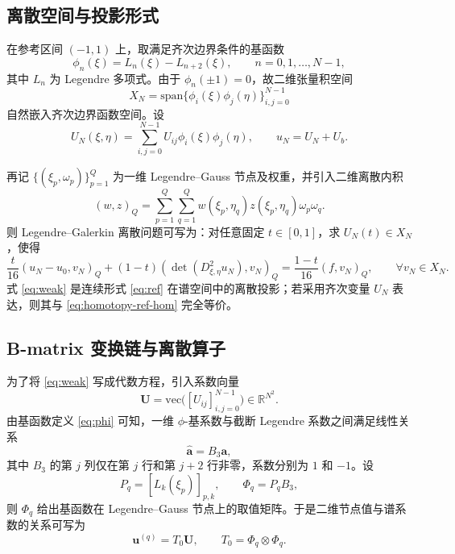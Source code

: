 \documentclass[11pt,a4paper]{article}
\begin{document}
\subsection{离散空间与投影形式}
在参考区间 $(-1,1)$ 上，取满足齐次边界条件的基函数
\begin{equation}
\phi_n(\xi)=L_n(\xi)-L_{n+2}(\xi),
\qquad n=0,1,\dots,N-1,
\label{eq:phi}
\end{equation}
其中 $L_n$ 为 Legendre 多项式。由于 $\phi_n(\pm 1)=0$，故二维张量积空间
\begin{equation}
X_N=\mathrm{span}\{\phi_i(\xi)\phi_j(\eta)\}_{i,j=0}^{N-1}
\label{eq:space}
\end{equation}
自然嵌入齐次边界函数空间。设
\begin{equation}
U_N(\xi,\eta)=\sum_{i,j=0}^{N-1}U_{ij}\phi_i(\xi)\phi_j(\eta),
\qquad
u_N=U_N+U_b.
\label{eq:UN}
\end{equation}

再记 $\{(\xi_p,\omega_p)\}_{p=1}^Q$ 为一维 Legendre--Gauss 节点及权重，并引入二维离散内积
\begin{equation}
(w,z)_Q=\sum_{p=1}^Q\sum_{q=1}^Q w(\xi_p,\eta_q)z(\xi_p,\eta_q)\omega_p\omega_q.
\label{eq:quad-inner}
\end{equation}
则 Legendre--Galerkin 离散问题可写为：对任意固定 $t\in[0,1]$，求 $U_N(t)\in X_N$，使得
\begin{equation}
\frac{t}{16}(u_N-u_0,v_N)_Q+(1-t)(\det(D^2_{\xi,\eta}u_N),v_N)_Q=\frac{1-t}{16}(f,v_N)_Q,
\qquad \forall v_N\in X_N.
\label{eq:weak}
\end{equation}
式 \eqref{eq:weak} 是连续形式 \eqref{eq:ref} 在谱空间中的离散投影；若采用齐次变量 $U_N$ 表达，则其与 \eqref{eq:homotopy-ref-hom} 完全等价。

\subsection{B-matrix 变换链与离散算子}
为了将 \eqref{eq:weak} 写成代数方程，引入系数向量
\[
\bm{U}=\mathrm{vec}\bigl([U_{ij}]_{i,j=0}^{N-1}\bigr)\in\mathbb{R}^{N^2}.
\]
由基函数定义 \eqref{eq:phi} 可知，一维 $\phi$-基系数与截断 Legendre 系数之间满足线性关系
\begin{equation}
\widehat{\bm a}=B_3\bm a,
\label{eq:B3}
\end{equation}
其中 $B_3$ 的第 $j$ 列仅在第 $j$ 行和第 $j+2$ 行非零，系数分别为 $1$ 和 $-1$。设
\[
P_q=[L_k(\xi_p)]_{p,k},
\qquad
\Phi_q=P_qB_3,
\]
则 $\Phi_q$ 给出基函数在 Legendre--Gauss 节点上的取值矩阵。于是二维节点值与谱系数的关系可写为
\begin{equation}
\bm u^{(q)}=T_0\bm U,
\qquad
T_0=\Phi_q\otimes\Phi_q.
\label{eq:T0}
\end{equation}
\end{document}
